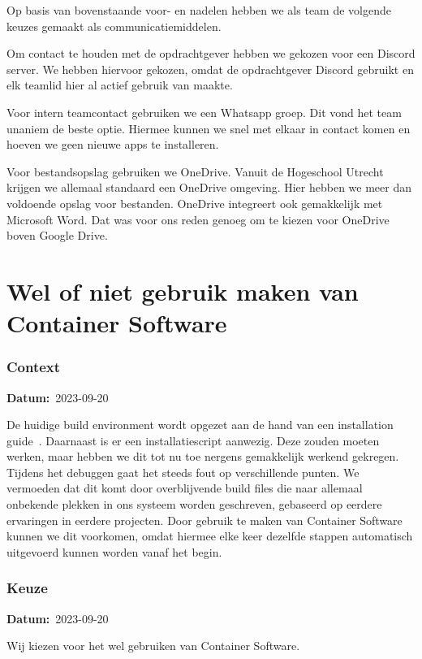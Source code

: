 \documentclass[a4paper]{report}
\newcommand{\teambox}{
  \begin{tcolorbox}[hbox, colback=blue!5!white,colframe=blue!75!black,
    left=.1mm, right=.1mm, top=.1mm, bottom=.1mm, fontupper=\scriptsize\sffamily]
    Team Keuze
  \end{tcolorbox}
}
\newcommand{\teamchoice}[1]{
  \section[ #1 ]{#1~\mbox{\raisebox{-2.5pt}{\teambox}}}
}
\newcommand{\timestamp}[1]{
  \mbox{\scriptsize \textbf{Datum:} #1} \smallbreak
}
\begin{document}
Op basis van bovenstaande voor- en nadelen hebben we als team de volgende keuzes gemaakt als communicatiemiddelen.
\par\smallskip
Om contact te houden met de opdrachtgever hebben we gekozen voor een Discord server.
We hebben hiervoor gekozen, omdat de opdrachtgever Discord gebruikt en elk teamlid hier al actief gebruik van maakte.
\par \smallskip 
Voor intern teamcontact gebruiken we een Whatsapp groep. Dit vond het team unaniem de beste optie. Hiermee kunnen we snel met elkaar in contact komen en hoeven we geen nieuwe apps te installeren. 
\par \smallskip
Voor bestandsopslag gebruiken we OneDrive. Vanuit de Hogeschool Utrecht krijgen we allemaal standaard een OneDrive omgeving.
Hier hebben we meer dan voldoende opslag voor bestanden. OneDrive integreert ook gemakkelijk met Microsoft Word. 
Dat was voor ons reden genoeg om te kiezen voor OneDrive boven Google Drive.

\teamchoice{Wel of niet gebruik maken van Container Software}
\label{sec:dockerchoice}
\subsubsection{Context}
\timestamp{2023-09-20}
De huidige build environment wordt opgezet aan de hand van een installation guide~\cite{fairphonegithub}.
Daarnaast is er een installatiescript aanwezig.
Deze zouden moeten werken, maar hebben we dit tot nu toe nergens gemakkelijk werkend gekregen.
Tijdens het debuggen gaat het steeds fout op verschillende punten. 
We vermoeden dat dit komt door overblijvende build files die naar allemaal onbekende plekken in ons systeem worden geschreven, gebaseerd op eerdere ervaringen in eerdere projecten.
Door gebruik te maken van Container Software kunnen we dit voorkomen, omdat hiermee elke keer dezelfde stappen automatisch uitgevoerd kunnen worden vanaf het begin.

\subsubsection{Keuze}
\timestamp{2023-09-20}
Wij kiezen voor het wel gebruiken van Container Software.
\end{document}
